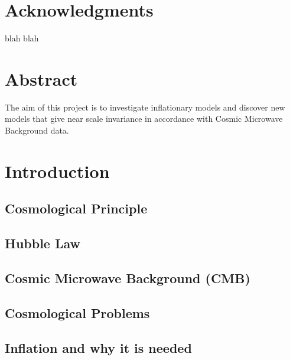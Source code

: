 \documentclass[12pt]{article} %
\begin{document}

\tableofcontents %

\newpage %
\section{Acknowledgments}

blah blah

\newpage

\section{Abstract}
The aim of this project is to investigate inflationary models and discover new models that give near scale invariance in accordance with Cosmic Microwave Background data.

\newpage

\section{Introduction} %

\subsection{Cosmological Principle}

\subsection{Hubble Law}

\subsection{Cosmic Microwave Background (CMB)}

\subsection{Cosmological Problems}

\subsection{Inflation and why it is needed}
\end{document}
